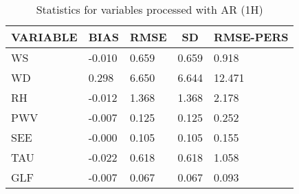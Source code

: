 \begin{table}[]
\begin{center}
\begin{tabular}{|l|l|l|l|l|}
\hline
\multicolumn{1}{c|}{\cellcolor[HTML]{C0C0C0}\textbf{VARIABLE}} & \multicolumn{1}{c|}{\cellcolor[HTML]{C0C0C0}\textbf{BIAS}} & \multicolumn{1}{c|}{\cellcolor[HTML]{C0C0C0}\textbf{RMSE}} & \multicolumn{1}{c|}{\cellcolor[HTML]{C0C0C0}\textbf{SD}} & \multicolumn{1}{c|}{\cellcolor[HTML]{C0C0C0}\textbf{RMSE-PERS}}\\\hline
\cellcolor[HTML]{C0C0C0}WS  &    -0.010                                &     0.659                                &     0.659  &     0.918 \\
\cellcolor[HTML]{C0C0C0}WD  &     0.298                                &     6.650                                &     6.644  &    12.471 \\
\cellcolor[HTML]{C0C0C0}RH  &    -0.012                                &     1.368                                &     1.368  &     2.178 \\
\cellcolor[HTML]{C0C0C0}PWV &    -0.007                               &     0.125                               &     0.125 &     0.252 \\
\cellcolor[HTML]{C0C0C0}SEE &    -0.000                               &     0.105                               &     0.105 &     0.155 \\
\cellcolor[HTML]{C0C0C0}TAU &    -0.022                               &     0.618                               &     0.618 &     1.058 \\
\cellcolor[HTML]{C0C0C0}GLF &    -0.007                               &     0.067                               &     0.067 &     0.093 \\
\hline
\end{tabular}
\caption{Statistics for variables processed with AR (1H)}
\end{center}
\end{table}
